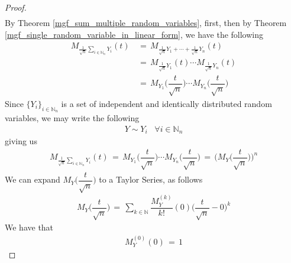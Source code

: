 \begin{theorem}
\begin{proof}
\begin{align*}
        \end{align*}
        By Theorem \ref{mgf_sum_multiple_random_variables}, first, then by Theorem \ref{mgf_single_random_variable_in_linear_form}, we have the following
        \begin{align*}
            M_{\frac{1}{\sqrt{n}}\sum_{i \in \mathbb{N}_{n}}Y_{i}} (t) \hspace{2pt} &= \hspace{2pt} M_{\frac{1}{\sqrt{n}}Y_{1} + \cdots + \frac{1}{\sqrt{n}}Y_{n}} (t) \\[1ex]
            &= \hspace{2pt} M_{\frac{1}{\sqrt{n}}Y_{1}} (t) \cdots M_{\frac{1}{\sqrt{n}}Y_{n}} (t) \\[1ex]
            &= \hspace{2pt} M_{Y_{1}} \Big(\dfrac{t}{\sqrt{n}}\Big) \cdots M_{Y_{n}} \Big(\dfrac{t}{\sqrt{n}}\Big)
        \end{align*}
        Since $\{Y_{i}\}_{i \in \mathbb{N}_{n}}$ is a set of independent and identically distributed random variables, we may write the following
        \begin{align*}
            Y \sim Y_{i} \hspace{10pt} \forall i \in \mathbb{N}_{n} 
        \end{align*}
        giving us
        \begin{align*}
            M_{\frac{1}{\sqrt{n}}\sum_{i \in \mathbb{N}_{n}}Y_{i}} (t) \hspace{2pt} = \hspace{2pt} M_{Y_{1}} \Big(\dfrac{t}{\sqrt{n}}\Big) \cdots M_{Y_{n}} \Big(\dfrac{t}{\sqrt{n}}\Big) \hspace{2pt} = \hspace{2pt} \Big(M_{Y} \Big(\dfrac{t}{\sqrt{n}}\Big) \Big)^{n}
        \end{align*}
        We can expand $M_{Y} \Big(\dfrac{t}{\sqrt{n}}\Big)$ to a Taylor Series, as follows
        \begin{align*}
            M_{Y} \Big(\dfrac{t}{\sqrt{n}}\Big) \hspace{2pt} = \hspace{2pt} \sum_{k \in \mathbb{N}} \dfrac{M_{Y}^{(k)}}{k!} (0) \Big(\dfrac{t}{\sqrt{n}} - 0\Big)^{k}
        \end{align*}
        We have that 
        \begin{align*}
            M_{Y}^{(0)} (0) \hspace{2pt} = \hspace{2pt} 1

\end{align*}
\end{proof}
\end{theorem}
